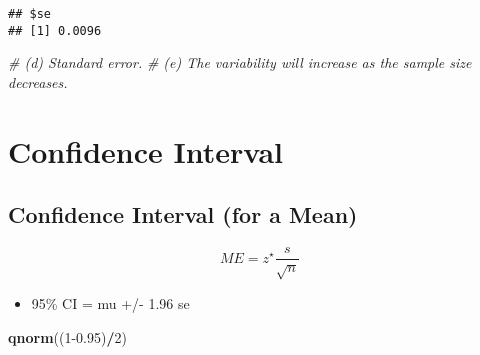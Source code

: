 \documentclass[]{book}
\newenvironment{Shaded}{\begin{snugshade}}{\end{snugshade}}
\newcommand{\CommentTok}[1]{\textcolor[rgb]{0.56,0.35,0.01}{\textit{#1}}}
\newcommand{\DataTypeTok}[1]{\textcolor[rgb]{0.13,0.29,0.53}{#1}}
\newcommand{\DecValTok}[1]{\textcolor[rgb]{0.00,0.00,0.81}{#1}}
\newcommand{\FloatTok}[1]{\textcolor[rgb]{0.00,0.00,0.81}{#1}}
\newcommand{\KeywordTok}[1]{\textcolor[rgb]{0.13,0.29,0.53}{\textbf{#1}}}
\newcommand{\NormalTok}[1]{#1}
\newcommand{\OperatorTok}[1]{\textcolor[rgb]{0.81,0.36,0.00}{\textbf{#1}}}
\newcommand{\StringTok}[1]{\textcolor[rgb]{0.31,0.60,0.02}{#1}}
\providecommand{\tightlist}{%
  \setlength{\itemsep}{0pt}\setlength{\parskip}{0pt}}
\begin{document}
\begin{Shaded}
\end{Shaded}

\begin{verbatim}
## $se
## [1] 0.0096
\end{verbatim}

\begin{Shaded}
\begin{Highlighting}[]
\CommentTok{# (d) Standard error.}
\CommentTok{# (e) The variability will increase as the sample size decreases.}
\end{Highlighting}
\end{Shaded}

\hypertarget{confidence-interval}{%
\section*{Confidence Interval}\label{confidence-interval}}

\hypertarget{confidence-interval-for-a-mean}{%
\subsection*{Confidence Interval (for a Mean)}\label{confidence-interval-for-a-mean}}

\[ ME = z^\star \frac{s}{\sqrt{n}} \]

\begin{itemize}
\tightlist
\item
  95\% CI = mu +/- 1.96 se
\end{itemize}

\begin{Shaded}
\begin{Highlighting}[]
\KeywordTok{qnorm}\NormalTok{((}\DecValTok{1}\FloatTok{-0.95}\NormalTok{)}\OperatorTok{/}\DecValTok{2}\NormalTok{)}
\end{Highlighting}
\end{Shaded}
\end{document}
